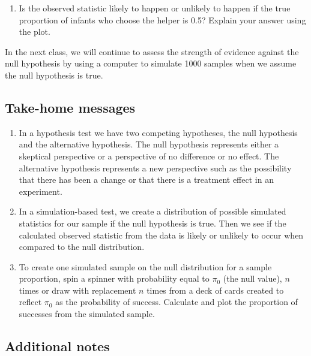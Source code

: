 \documentclass[
]{report}
\providecommand{\tightlist}{%
  \setlength{\itemsep}{0pt}\setlength{\parskip}{0pt}}
\begin{document}
\vspace{1in}

\begin{enumerate}
\def\labelenumi{\arabic{enumi}.}
\setcounter{enumi}{16}
\tightlist
\item
  Is the observed statistic likely to happen or unlikely to happen if the true proportion of infants who choose the helper is 0.5? Explain your answer using the plot.
\end{enumerate}

\vspace{0.8in}

In the next class, we will continue to assess the strength of evidence against the null hypothesis by using a computer to simulate 1000 samples when we assume the null hypothesis is true.

\hypertarget{take-home-messages-8}{%
\subsection{Take-home messages}\label{take-home-messages-8}}

\begin{enumerate}
\def\labelenumi{\arabic{enumi}.}
\item
  In a hypothesis test we have two competing hypotheses, the null hypothesis and the alternative hypothesis. The null hypothesis represents either a skeptical perspective or a perspective of no difference or no effect. The alternative hypothesis represents a new perspective such as the possibility that there has been a change or that there is a treatment effect in an experiment.
\item
  In a simulation-based test, we create a distribution of possible simulated statistics for our sample if the null hypothesis is true. Then we see if the calculated observed statistic from the data is likely or unlikely to occur when compared to the null distribution.
\item
  To create one simulated sample on the null distribution for a sample proportion, spin a spinner with probability equal to \(\pi_0\) (the null value), \(n\) times or draw with replacement \(n\) times from a deck of cards created to reflect \(\pi_0\) as the probability of success. Calculate and plot the proportion of successes from the simulated sample.
\end{enumerate}

\hypertarget{additional-notes-7}{%
\subsection{Additional notes}\label{additional-notes-7}}
\end{document}
